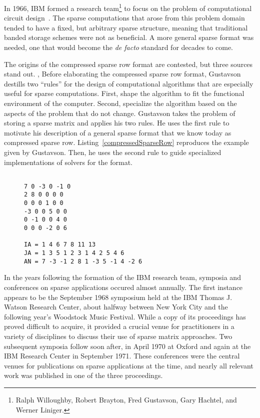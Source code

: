 In 1966, IBM formed a research team\footnote{Ralph Willoughby, Robert Brayton, Fred Gustavson, Gary Hachtel, and Werner Liniger.} to focus on the problem of computational circuit design~\cite{willoughby1971sparse}.
The sparse computations that arose from this problem domain tended to have a fixed, but arbitrary sparse structure, meaning that traditional banded storage schemes were not as beneficial.
A more general sparse format was needed, one that would become the \textit{de facto} standard for decades to come.

The origins of the compressed sparse row format are contested, but three sources stand out. 
, 
Before elaborating the compressed sparse row format, Gustavson~\cite{gustavson1972some} destills two \enquote{rules} for the design of computational algorithms that are especially useful for sparse computations. 
First, shape the algorithm to fit the functional environment of the computer. 
Second, specialize the algorithm based on the aspects of the problem that do not change.
Gustavson takes the problem of storing a sparse matrix and applies his two rules. 
He uses the first rule to motivate his description of a general sparse format that we know today as compressed sparse row. 
Listing~\ref{compressedSparseRow} reproduces the example given by Gustavson.
Then, he uses the second rule to guide specialized implementations of solvers for the format. 
\begin{figure}
\begin{lstlisting}[caption={Example of compressed sparse row storage given by~\cite{gustavson1972some}},label=compressedSparseRow]

7 0 -3 0 -1 0
2 8 0 0 0 0
0 0 0 1 0 0 
-3 0 0 5 0 0
0 -1 0 0 4 0 
0 0 0 -2 0 6

IA = 1 4 6 7 8 11 13
JA = 1 3 5 1 2 3 1 4 2 5 4 6
AN = 7 -3 -1 2 8 1 -3 5 -1 4 -2 6
\end{lstlisting}
\end{figure}


In the years following the formation of the IBM research team, symposia and conferences on sparse applications occured almost annually. 
The first instance appears to be the September 1968 symposium held at the IBM Thomas J. Watson Research Center, about halfway between New York City and the following year's Woodstock Music Festival. 
While a copy of its proceedings has proved difficult to acquire, it provided a crucial venue for practitioners in a variety of disciplines to discuss their use of sparse matrix approaches.
Two subsequent symposia follow soon after, in April 1970 at Oxford and again at the IBM Research Center in September 1971.
These conferences were the central venues for publications on sparse applications at the time, and nearly all relevant work was published in one of the three proceedings.


